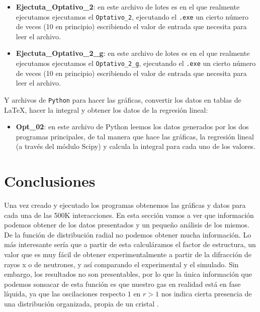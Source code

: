 \documentclass[11pt]{article} %
\begin{document}
\begin{itemize}
	\item \textbf{Ejectuta\_Optativo\_2}: en este archivo de lotes es en el que realmente ejecutamos ejecutamos el \texttt{Optativo\_2}, ejecutando el \texttt{.exe} un cierto número de veces (10 en principio) escribiendo el valor de entrada que necesita para leer el archivo. 
	\item \textbf{Ejectuta\_Optativo\_2\_g}: en este archivo de lotes es en el que realmente ejecutamos ejecutamos el \texttt{Optativo\_2\_g}, ejecutando el \texttt{.exe} un cierto número de veces (10 en principio) escribiendo el valor de entrada que necesita para leer el archivo. 
\end{itemize}
Y archivos de \texttt{Python} para hacer las gráficas, convertir los datos en tablas de \LaTeX, hacer la integral y obtener los datos de la regresión lineal:

\begin{itemize}
	\item \textbf{Opt\_02}: en este archivo de Python leemos los datos generados por los dos programas principales, de tal manera que hace las gráficas, la regresión lineal (a través del módulo Scipy) y calcula la integral para cada uno de los valores.
\end{itemize}


\section{Conclusiones}

Una vez creado y ejecutado los programas obtenemos las gráficas y datos para cada una de las 500K interacciones. En esta sección vamos a ver que información podemos obtener de los datos presentados y un pequeño análisis de los mismos. De la función de distribución radial no podemos obtener mucha información. Lo más interesante sería que a partir de esta calculáramos el factor de estructura, un valor que es muy fácil de obtener experimentalmente a partir de la difracción de rayos x o de neutrones, y así comparando el experimental y el simulado. Sin embargo, los resultados no son presentables, por lo que la única información que podemos sonsacar de esta función es que nuestro gas en realidad está en fase líquida, ya que las oscilaciones respecto $1$ en $r>1$ nos indica cierta presencia de una distribución organizada, propia de un cristal \cite{Haile}.
\end{document}
